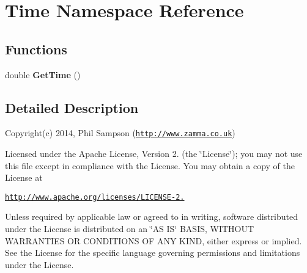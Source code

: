 \hypertarget{namespace_time}{}\section{Time Namespace Reference}
\label{namespace_time}
\subsection*{Functions}
\begin{DoxyCompactItemize}
\item 
\hypertarget{namespace_time_aa5dcef5b8d122df3f323afd164dd67f7}{}double {\bfseries Get\+Time} ()\label{namespace_time_aa5dcef5b8d122df3f323afd164dd67f7}

\end{DoxyCompactItemize}


\subsection{Detailed Description}
Copyright(c) 2014, Phil Sampson (\href{http://www.zamma.co.uk}{\tt http\+://www.\+zamma.\+co.\+uk})

Licensed under the Apache License, Version 2. (the \char`\"{}\+License\char`\"{}); you may not use this file except in compliance with the License. You may obtain a copy of the License at

\href{http://www.apache.org/licenses/LICENSE-2.0}{\tt http\+://www.\+apache.\+org/licenses/\+L\+I\+C\+E\+N\+S\+E-\/2.}

Unless required by applicable law or agreed to in writing, software distributed under the License is distributed on an \char`\"{}\+A\+S I\+S\char`\"{} B\+A\+S\+I\+S, W\+I\+T\+H\+O\+U\+T W\+A\+R\+R\+A\+N\+T\+I\+E\+S O\+R C\+O\+N\+D\+I\+T\+I\+O\+N\+S O\+F A\+N\+Y K\+I\+N\+D, either express or implied. See the License for the specific language governing permissions and limitations under the License. 